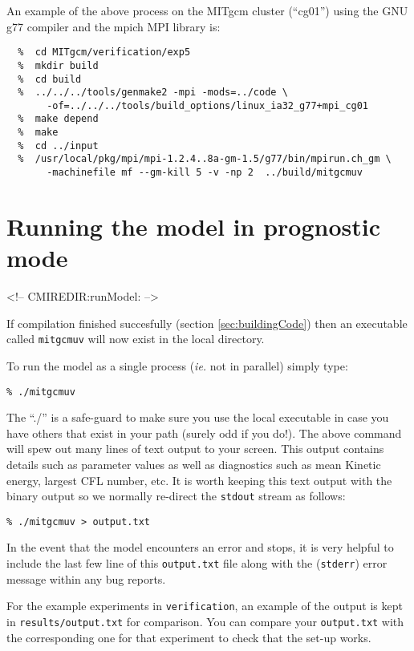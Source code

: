 An example of the above process on the MITgcm cluster (``cg01'') using
the GNU g77 compiler and the mpich MPI library is:

{\footnotesize \begin{verbatim}
  %  cd MITgcm/verification/exp5
  %  mkdir build
  %  cd build
  %  ../../../tools/genmake2 -mpi -mods=../code \
       -of=../../../tools/build_options/linux_ia32_g77+mpi_cg01
  %  make depend
  %  make
  %  cd ../input
  %  /usr/local/pkg/mpi/mpi-1.2.4..8a-gm-1.5/g77/bin/mpirun.ch_gm \
       -machinefile mf --gm-kill 5 -v -np 2  ../build/mitgcmuv
\end{verbatim} }

\section[Running MITgcm]{Running the model in prognostic mode}
\label{sec:runModel}
\begin{rawhtml}
<!-- CMIREDIR:runModel: -->
\end{rawhtml}

If compilation finished succesfully (section \ref{sec:buildingCode})
then an executable called \texttt{mitgcmuv} will now exist in the
local directory.

To run the model as a single process (\textit{ie.} not in parallel)
simply type:
\begin{verbatim}
% ./mitgcmuv
\end{verbatim}
The ``./'' is a safe-guard to make sure you use the local executable
in case you have others that exist in your path (surely odd if you
do!). The above command will spew out many lines of text output to
your screen.  This output contains details such as parameter values as
well as diagnostics such as mean Kinetic energy, largest CFL number,
etc. It is worth keeping this text output with the binary output so we
normally re-direct the \texttt{stdout} stream as follows:
\begin{verbatim}
% ./mitgcmuv > output.txt
\end{verbatim}
In the event that the model encounters an error and stops, it is very
helpful to include the last few line of this \texttt{output.txt} file
along with the (\texttt{stderr}) error message within any bug reports.

For the example experiments in \texttt{verification}, an example of the
output is kept in \texttt{results/output.txt} for comparison. You can
compare your \texttt{output.txt} with the corresponding one for that
experiment to check that the set-up works.



